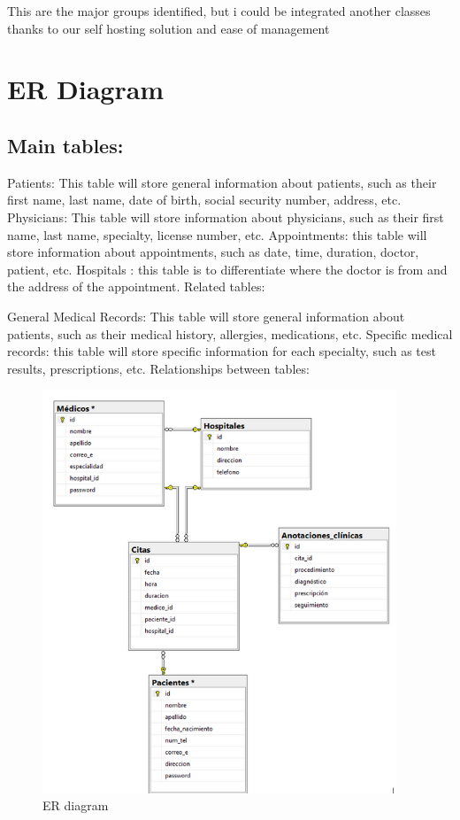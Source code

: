 \documentclass{scrreprt}
\begin{document}
This are the major groups identified, but i could be integrated another classes thanks to our self hosting solution and ease of management

\pagebreak


	
	\section{ER Diagram}
	\subsection{Main tables:}
	Patients: This table will store general information about patients, such as their first name, last name, date of birth, social security number, address, etc.
	Physicians: This table will store information about physicians, such as their first name, last name, specialty, license number, etc.
	Appointments: this table will store information about appointments, such as date, time, duration, doctor, patient, etc.
	Hospitals : this table is to differentiate where the doctor is from and the address of the appointment.  
	Related tables:
	
	General Medical Records: This table will store general information about patients, such as their medical history, allergies, medications, etc.
	Specific medical records: this table will store specific information for each specialty, such as test results, prescriptions, etc.
	Relationships between tables:
	\begin{figure}[h]
		\centering
		\includegraphics[width=300pt]{entidadrelacion.png}
		\caption{ER diagram}
		\label{fig:ER}
	\end{figure}
	
\end{document}
